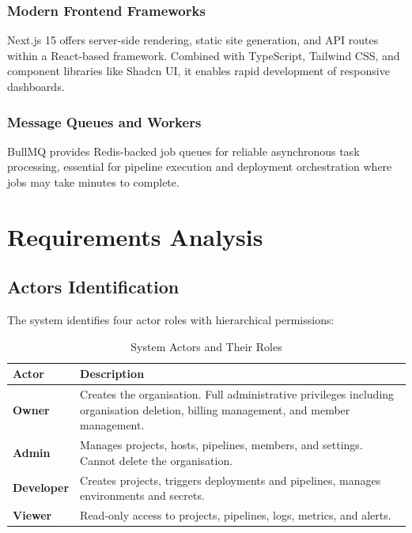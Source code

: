 \documentclass[12pt,a4paper,twoside]{report}
\begin{document}
\subsection{Modern Frontend Frameworks}
Next.js 15 offers server-side rendering, static site generation, and API routes within a React-based framework. Combined with TypeScript, Tailwind CSS, and component libraries like Shadcn UI, it enables rapid development of responsive dashboards.

\subsection{Message Queues and Workers}
BullMQ provides Redis-backed job queues for reliable asynchronous task processing, essential for pipeline execution and deployment orchestration where jobs may take minutes to complete.


\chapter{Requirements Analysis}

\section{Actors Identification}

The system identifies four actor roles with hierarchical permissions:

\begin{table}[H]
\centering
\caption{System Actors and Their Roles}
\label{tab:actors}
\begin{tabularx}{\textwidth}{l|X}
\toprule
\textbf{Actor} & \textbf{Description} \\
\midrule
\textbf{Owner} & Creates the organisation. Full administrative privileges including organisation deletion, billing management, and member management. \\
\textbf{Admin} & Manages projects, hosts, pipelines, members, and settings. Cannot delete the organisation. \\
\textbf{Developer} & Creates projects, triggers deployments and pipelines, manages environments and secrets. \\
\textbf{Viewer} & Read-only access to projects, pipelines, logs, metrics, and alerts. \\
\bottomrule
\end{tabularx}
\end{table}
\end{document}
